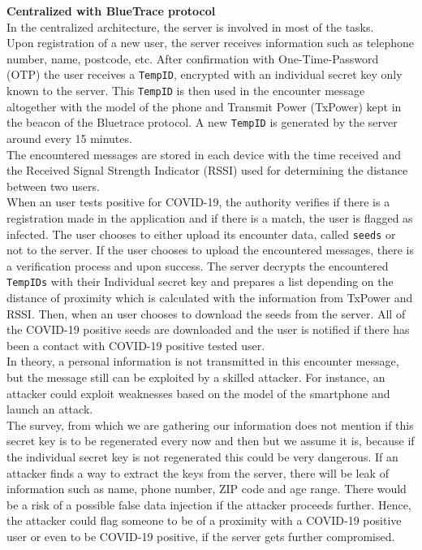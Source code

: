 \documentclass[a4paper, twocolumn]{article}
\begin{document}
\noindent \textbf{Centralized with BlueTrace protocol}\\
In the centralized architecture, the server is involved in most of the tasks.\\
Upon registration of a new user, the server receives information such as telephone number, name, postcode, etc. After confirmation with One-Time-Password (OTP) the user receives a \texttt{TempID}, encrypted with an individual secret key only known to the server. This \texttt{TempID} is then used in the encounter message altogether with the model of the phone and Transmit Power (TxPower) kept in the beacon of the Bluetrace protocol. A new \texttt{TempID} is generated by the server around every 15 minutes.\\
The encountered messages are stored in each device with the time received and the Received Signal Strength Indicator (RSSI) used for determining the distance between two users.\\
When an user tests positive for COVID-19, the authority verifies if there is a registration made in the application and if there is a match, the user is flagged as infected. The user chooses to either upload its encounter data, called \texttt{seeds} or not to the server. If the user chooses to upload the encountered messages, there is a verification process and upon success. The server decrypts the encountered \texttt{TempIDs} with their Individual secret key and prepares a list depending on the distance of proximity which is calculated with the information from TxPower and RSSI. Then, when an user chooses to download the seeds from the server. All of the COVID-19 positive seeds are downloaded and the user is notified if there has been a contact with COVID-19 positive tested user.\\

\noindent In theory, a personal information is not transmitted in this encounter message, but the message still can be exploited by a skilled attacker. For instance, an attacker could exploit weaknesses based on the model of the smartphone and launch an attack.\\
The survey, from which we are gathering our information does not mention if this secret key is to be regenerated every now and then but we assume it is, because if the individual secret key is not regenerated this could be very dangerous. If an attacker finds a way to extract the keys from the server, there will be leak of information such as name, phone number, ZIP code and age range. There would be a risk of a possible false data injection if the attacker proceeds further. Hence, the attacker could flag someone to be of a proximity with a COVID-19 positive user or even to be COVID-19 positive, if the server gets further compromised.\\
\end{document}
